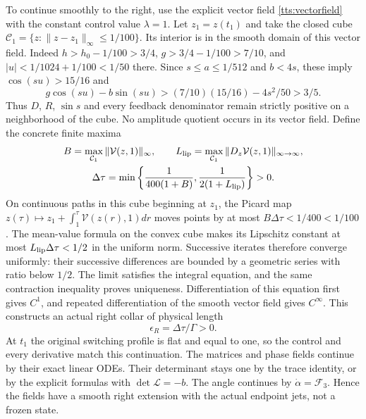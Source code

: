 To continue smoothly to the right, use the explicit vector field
\eqref{tts:vectorfield} with the constant control value $\lambda=1$.
Let $z_1=z(t_1)$ and take the closed cube
$\mathcal C_1=\{z:\|z-z_1\|_\infty\leq1/100\}$.
Its interior is in the smooth domain of this vector field. Indeed
$h>h_0-1/100>3/4$, $g>3/4-1/100>7/10$, and
$|u|<1/1024+1/100<1/50$ there. Since $s\leq a\leq1/512$
and $b<4s$, these imply $\cos(su)>15/16$ and
\[
 g\cos(su)-b\sin(su)
    >(7/10)(15/16)-4s^2/50>3/5.
\]
Thus $D$, $R$, $\sin s$ and every feedback denominator remain
strictly positive on a neighborhood of the cube. No amplitude
quotient occurs in its vector field. Define the concrete finite maxima
\begin{equation}\label{tts:collarconstants}
 \begin{gathered}
 B=\max_{\mathcal C_1}\|\mathcal V(z,1)\|_\infty,
 \qquad L_{\rm lip}=\max_{\mathcal C_1}
                            \|D_z\mathcal V(z,1)\|_{\infty\to\infty},\\
 \Delta\tau=\min\left\{\frac1{400(1+B)},
                            \frac1{2(1+L_{\rm lip})}\right\}>0.
 \end{gathered}
\end{equation}
On continuous paths in this cube beginning at $z_1$, the Picard
map $z(\tau)\mapsto z_1+\int_1^\tau\mathcal V(z(r),1)dr$
moves points by at most $B\Delta\tau<1/400<1/100$.
The mean-value formula on the convex cube makes its Lipschitz
constant at most $L_{\rm lip}\Delta\tau<1/2$ in the uniform
norm. Successive iterates therefore converge uniformly: their
successive differences are bounded by a geometric series with
ratio below $1/2$. The limit satisfies the integral equation,
and the same contraction inequality proves uniqueness. Differentiation
of this equation first gives $C^1$, and repeated differentiation of
the smooth vector field gives $C^\infty$. This constructs an actual
right collar of physical length
\begin{equation}\label{tts:collarlength}
 \epsilon_R=\Delta\tau/\Gamma>0.
\end{equation}
At $t_1$ the original switching profile is flat and equal to one,
so the control and every derivative match this continuation.
The matrices and phase fields continue by their exact linear ODEs.
Their determinant stays one by the trace identity, or by the
explicit formulas with $\det\mathcal L=-b$. The angle continues
by $\dot\alpha=\mathcal F_3$. Hence the fields have a smooth
right extension with the actual endpoint jets, not a frozen state.

